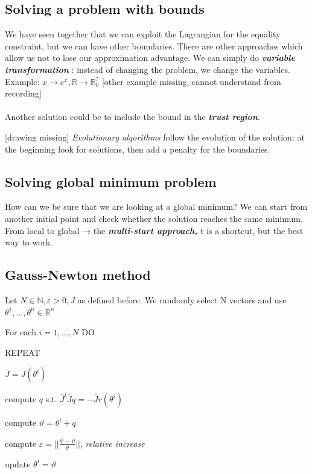 \subsection{Solving a problem with bounds}
We have seen together that we can exploit the Lagrangian for the
  equality constraint, but we can have other boundaries. There are other
  approaches which allow us not to lose our approximation advantage. We
  can simply do \textbf{\emph{variable transformation}} : instead of
  changing the problem, we change the variables.
\noindent
Example: $x \rightarrow e^x, \mathbb{R} \rightarrow \mathbb{R}_0^?$
{[}other example missing, cannot understand from recording{]}
\\
\\
\noindent
 Another solution could be to include the bound in the \textbf{\emph{trust region}}.

{[}drawing missing{]}
\noindent
\emph{Evolutionary algorithms} follow the evolution of the solution: at
the beginning look for solutions, then add a penalty for the boundaries.

\subsection{Solving global minimum problem}

How can we be sure that we are looking at a global minimum? We can start
from another initial point and check whether the solution reaches the
same minimum.
\noindent
From local to global → the \textbf{\emph{multi-start approach,}} t is a
shortcut, but the best way to work.

\subsection{Gauss-Newton method}

Let $N \in \mathbb{N}, \varepsilon > 0, J$ as defined before. We randomly select N vectors and use
$\theta^1, \dots, \theta^n \in \mathbb{R}^n$

For each $i=1,\dots,N$ DO

REPEAT

$\bar{J}=J(\theta^i)$

compute $q$ s.t. $\bar{J}^i\bar{J}q=-\bar{J}r(\theta^i)$

compute $\vartheta = \theta^i + q$

compute $\varepsilon = ||\frac{\theta^i-\vartheta}{\theta}||$,
\emph{relative increase}

update $\theta^i = \vartheta$


